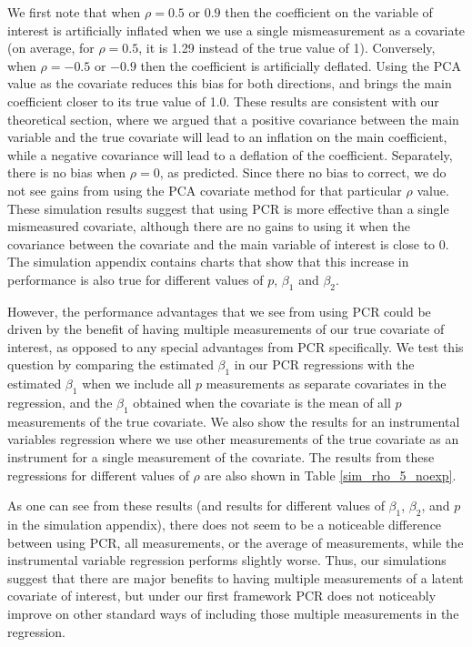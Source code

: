 \documentclass[10pt]{article}
\begin{document}
We first note that when $\rho = 0.5$ or $0.9$ then the coefficient on the variable of interest is artificially inflated when we use a single mismeasurement as a covariate (on average, for $\rho = 0.5$, it is 1.29 instead of the true value of 1). Conversely, when $\rho = -0.5$ or $-0.9$ then the coefficient is artificially deflated. Using the PCA value as the covariate reduces this bias for both directions, and brings the main coefficient closer to its true value of 1.0. These results are consistent with our theoretical section, where we argued that a positive covariance between the main variable and the true covariate will lead to an inflation on the main coefficient, while a negative covariance will lead to a deflation of the coefficient. Separately, there is no bias when $\rho = 0$, as predicted. Since there no bias to correct, we do not see gains from using the PCA covariate method for that particular $\rho$ value. These simulation results suggest that using PCR is more effective than a single mismeasured covariate, although there are no gains to using it when the covariance between the covariate and the main variable of interest is close to $0$. The simulation appendix contains charts that show that this increase in performance is also true for different values of $p$, $\beta_1$ and $\beta_2$.

However, the performance advantages that we see from using PCR could be driven by the benefit of having multiple measurements of our true covariate of interest, as opposed to any special advantages from PCR specifically. We test this question by comparing the estimated $\beta_1$ in our PCR regressions with the estimated $\beta_1$ when we include all $p$ measurements as separate covariates in the regression, and the $\beta_1$ obtained when the covariate is the mean of all $p$ measurements of the true covariate. We also show the results for an instrumental variables regression where we use other measurements of the true covariate as an instrument for a single measurement of the covariate. The results from these regressions for different values of $\rho$ are also shown in Table \ref{sim_rho_5_noexp}.

As one can see from these results (and results for different values of $\beta_1$, $\beta_2$, and $p$ in the simulation appendix), there does not seem to be a noticeable difference between using PCR, all measurements, or the average of measurements, while the instrumental variable regression performs slightly worse. Thus, our simulations suggest that there are major benefits to having multiple measurements of a latent covariate of interest, but under our first framework PCR does not noticeably improve on other standard ways of including those multiple measurements in the regression.
\end{document}
